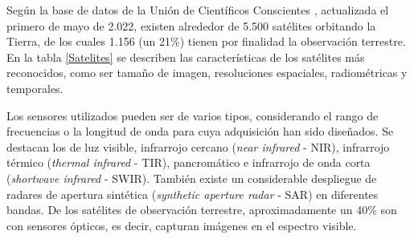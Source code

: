 Según la base de datos de la Unión de Científicos Conscientes \cite{noauthor_satelites_nodate}, actualizada el primero de mayo de 2.022, existen alrededor de 5.500 satélites orbitando la Tierra, de los cuales 1.156 (un 21\%) tienen por finalidad la observación terrestre. En la tabla \ref{Satelites} se describen las características de los satélites más reconocidos, como ser tamaño de imagen, resoluciones espaciales, radiométricas y temporales. 

Los sensores utilizados pueden ser de varios tipos, considerando el rango de frecuencias o la longitud de onda para cuya adquisición han sido diseñados. Se destacan los de luz visible, infrarrojo cercano (\textit{near infrared} - NIR), infrarrojo térmico (\textit{thermal infrared} - TIR), pancromático e infrarrojo de onda corta (\textit{shortwave infrared} - SWIR). También existe un considerable despliegue de radares de apertura sintética (\textit{synthetic aperture radar} - SAR) en diferentes bandas. De los satélites de observación terrestre, aproximadamente un 40\% son con sensores ópticos, es decir, capturan imágenes en el espectro visible.

